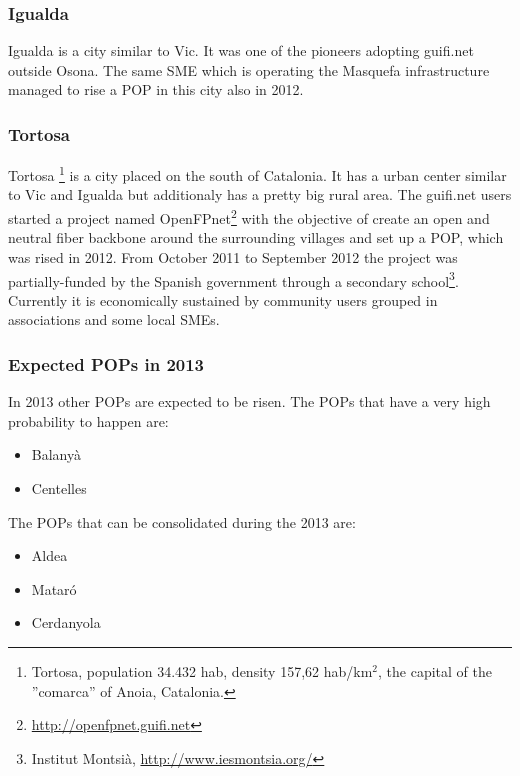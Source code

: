\FloatBarrier
\subsubsection{Igualda}

Igualda is a city similar to Vic. It was one of the pioneers adopting guifi.net outside Osona. The same SME which is operating the Masquefa infrastructure managed to rise a POP in this city also in 2012.


\FloatBarrier
\subsubsection{Tortosa}
Tortosa \footnote{Tortosa, population 34.432 hab, density 157,62 hab/km$^{2}$, the capital of the ''comarca'' of Anoia, Catalonia.} is a city placed on the south of Catalonia. It has a urban center similar to Vic and Igualda but additionaly has a pretty big rural area. The guifi.net users started a project named  OpenFPnet\footnote{\url{http://openfpnet.guifi.net}} with the objective of create an open and neutral fiber backbone around the surrounding villages and set up a POP, which was rised in 2012. From October 2011 to September 2012 the project was partially-funded by the Spanish government through a secondary school\footnote{Institut Montsià, \url{http://www.iesmontsia.org/}}. Currently it is economically sustained by community users grouped in associations and some local SMEs.



\FloatBarrier
\subsubsection{Expected POPs in 2013}

In 2013 other POPs are expected to be risen. The POPs that have a very high probability to happen are:

\begin{itemize}
  \item Balany\`{a}
  \item Centelles
\end{itemize} 

The POPs that can be consolidated during the 2013 are:

\begin{itemize}
  \item Aldea
  \item Matar\'{o}
  \item Cerdanyola
\end{itemize} 
